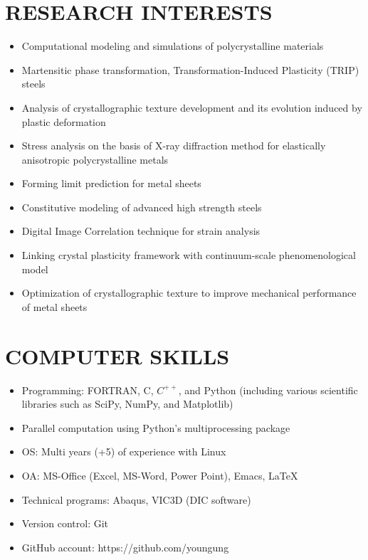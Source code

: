 \documentclass{res}
\begin{document}
\begin{resume}
  \section{RESEARCH INTERESTS}
  \begin{itemize}
  \item Computational modeling and simulations of polycrystalline materials
  \item Martensitic phase transformation, Transformation-Induced Plasticity (TRIP) steels
  \item Analysis of crystallographic texture development and its evolution induced by plastic deformation
  \item Stress analysis on the basis of X-ray diffraction method for elastically anisotropic polycrystalline metals
  \item Forming limit prediction for metal sheets
  \item Constitutive modeling of advanced high strength steels
  \item Digital Image Correlation technique for strain analysis
  \item Linking crystal plasticity framework with continuum-scale phenomenological model
  \item Optimization of crystallographic texture to improve mechanical performance of metal sheets
  \end{itemize}

  \section{COMPUTER SKILLS}
  \begin{itemize}
  \item Programming: FORTRAN, C, $C^{++}$, and Python (including various scientific libraries such as SciPy, NumPy, and Matplotlib)
  \item Parallel computation using Python's multiprocessing package
  \item OS: Multi years (+5) of experience with Linux
  \item OA: MS-Office (Excel, MS-Word, Power Point), Emacs, \LaTeX
  \item Technical programs: Abaqus, VIC3D (DIC software)
  \item Version control: Git
  \item GitHub account: https://github.com/youngung
  \end{itemize}


\end{resume}
\end{document}
